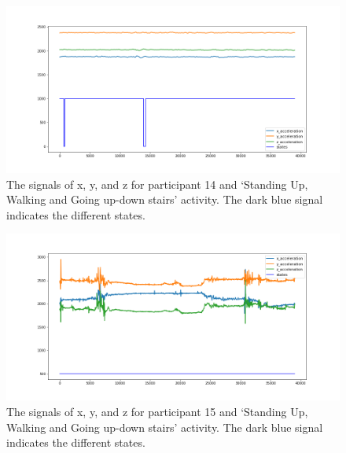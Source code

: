 \begin{figure}[H]
    \centering
    \begin{minipage}[b]{1\textwidth}
        \includegraphics[width=\textwidth]{manuscript/src/figures/Ass3/Ass3_Q2_states_user_13.png}
    \end{minipage}
    \caption{The signals of x, y, and z for participant 14 and ‘Standing  Up,  Walking  and  Going  up-down  stairs’ activity. The dark blue signal indicates the different states.}
    \label{fig:Ass3_Q2_states_user_13}
\end{figure}
\begin{figure}[H]
    \centering
    \begin{minipage}[b]{1\textwidth}
        \includegraphics[width=\textwidth]{manuscript/src/figures/Ass3/Ass3_Q2_states_user_14.png}
    \end{minipage}
    \caption{The signals of x, y, and z for participant 15 and ‘Standing  Up,  Walking  and  Going  up-down  stairs’ activity. The dark blue signal indicates the different states.}
    \label{fig:Ass3_Q2_states_user_14}
\end{figure}
